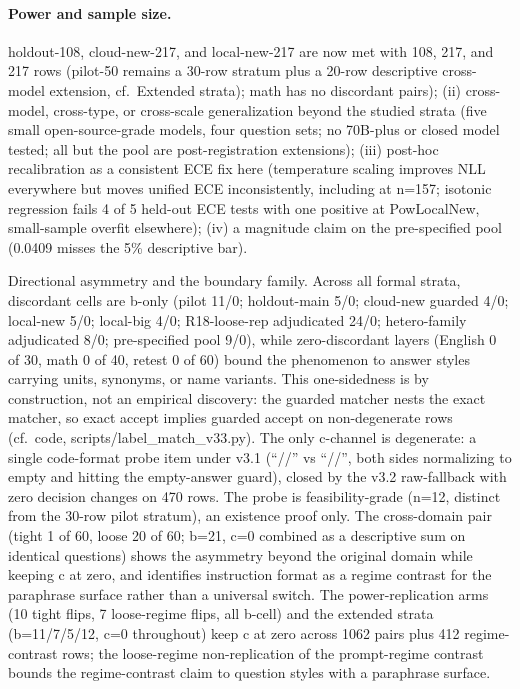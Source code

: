 \documentclass[10pt]{article} %
\begin{document}
\paragraph*{Power and sample size.} holdout-108, cloud-new-217, and local-new-217 are now met with 108, 217, and 217 rows (pilot-50 remains a 30-row stratum plus a 20-row descriptive cross-model extension, cf.\ Extended strata); math has no discordant pairs); (ii) cross-model, cross-type, or cross-scale generalization beyond the studied strata (five small open-source-grade models, four question sets; no 70B-plus or closed model tested; all but the pool are post-registration extensions); (iii) post-hoc recalibration as a consistent ECE fix here (temperature scaling improves NLL everywhere but moves unified ECE inconsistently, including at n=157; isotonic regression fails 4 of 5 held-out ECE tests with one positive at PowLocalNew, small-sample overfit elsewhere); (iv) a magnitude claim on the pre-specified pool (0.0409 misses the 5\% descriptive bar).

Directional asymmetry and the boundary family. Across all formal strata, discordant cells are b-only (pilot 11/0; holdout-main 5/0; cloud-new guarded 4/0; local-new 5/0; local-big 4/0; R18-loose-rep adjudicated 24/0; hetero-family adjudicated 8/0; pre-specified pool 9/0), while zero-discordant layers (English 0 of 30, math 0 of 40, retest 0 of 60) bound the phenomenon to answer styles carrying units, synonyms, or name variants. This one-sidedness is by construction, not an empirical discovery: the guarded matcher nests the exact matcher, so exact accept implies guarded accept on non-degenerate rows (cf.\ code, scripts/label\_match\_v33.py). The only c-channel is degenerate: a single code-format probe item under v3.1 (``//'' vs ``//'', both sides normalizing to empty and hitting the empty-answer guard), closed by the v3.2 raw-fallback with zero decision changes on 470 rows. The probe is feasibility-grade (n=12, distinct from the 30-row pilot stratum), an existence proof only. The cross-domain pair (tight 1 of 60, loose 20 of 60; b=21, c=0 combined as a descriptive sum on identical questions) shows the asymmetry beyond the original domain while keeping c at zero, and identifies instruction format as a regime contrast for the paraphrase surface rather than a universal switch. The power-replication arms (10 tight flips, 7 loose-regime flips, all b-cell) and the extended strata (b=11/7/5/12, c=0 throughout) keep c at zero across 1062 pairs plus 412 regime-contrast rows; the loose-regime non-replication of the prompt-regime contrast bounds the regime-contrast claim to question styles with a paraphrase surface.
\end{document}
